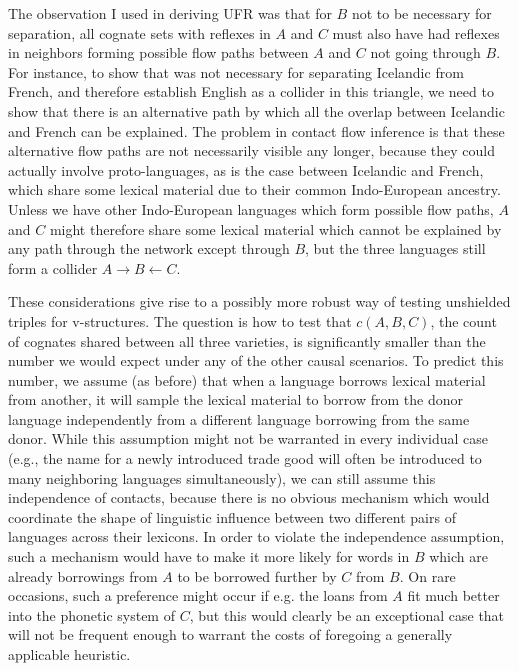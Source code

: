 The observation I used in deriving UFR was that for $B$ not to be necessary for separation, all cognate sets with reflexes in $A$ and $C$ must also have had reflexes in neighbors forming possible flow paths between $A$ and $C$ not going through $B$. For instance, to show that  was not necessary for separating Icelandic from French, and therefore establish English as a collider in this triangle, we need to show that there is an alternative path by which all the overlap between Icelandic and French can be explained. The problem in contact flow inference is that these alternative flow paths are not necessarily visible any longer, because they could actually involve proto-languages, as is the case between Icelandic and French, which share some lexical material due to their common Indo-European ancestry. Unless we have other Indo-European languages which form possible flow paths, $A$ and $C$ might therefore share some lexical material which cannot be explained by any path through the network except through $B$, but the three languages still form a collider $A \rightarrow B \leftarrow C$.

These considerations give rise to a possibly more robust way of testing unshielded triples for v-structures. The question is how to test that $c(A,B,C)$, the count of cognates shared between all three varieties, is significantly smaller than the number we would expect under any of the other causal scenarios. To predict this number, we assume (as before) that when a language borrows lexical material from another, it will sample the lexical material to borrow from the donor language independently from a different language borrowing from the same donor. While this assumption might not be warranted in every individual case (e.g., the name for a newly introduced trade good will often be introduced to many neighboring languages simultaneously), we can still assume this independence of contacts, because there is no obvious mechanism which would coordinate the shape of linguistic influence between two different pairs of languages across their lexicons. In order to violate the independence assumption, such a 
mechanism would have to make it more likely for words in $B$ which are already borrowings from $A$ to be borrowed further by $C$ from $B$. On rare occasions, such a preference might occur if e.g. the loans from $A$ fit much better into the phonetic system of $C$, but this would clearly be an exceptional case that will not be frequent enough to warrant the costs of foregoing a generally applicable heuristic.

